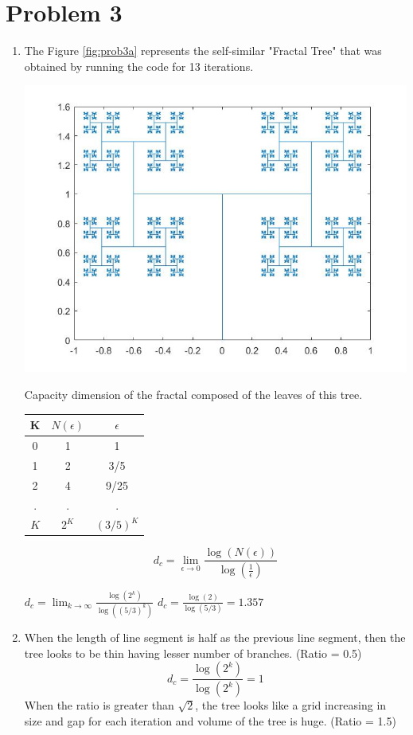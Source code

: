 \documentclass[11pt,a4paper]{article}
\begin{document}
\section*{Problem 3}

\begin{enumerate}[label=(\alph*)]

\item 
The Figure \ref{fig:prob3a} represents the self-similar "Fractal Tree" that was obtained by running the code for 13 iterations. \par\bigskip
\begin{minipage}{\linewidth}
{
\centering 
\includegraphics[scale=0.4]{images/prob3a.jpg}
\label{fig:prob3a}
}
\end{minipage}
\par\medskip
Capacity dimension of the fractal composed of the leaves of this tree.
\begin{center}
\begin{tabular}{ |c|c|c| } 
 \hline 
 K & $N(\epsilon)$ & $\epsilon$ \\
 \hline 
 0 & 1 & 1 \\ 
 1 & 2 & 3/5 \\
 2 & 4 & 9/25 \\
 . & . & . \\
 $K$ & $2^K$ & $(3/5)^K$\\
 \hline
\end{tabular}
\end{center}
$$d_c = \lim_{\epsilon \to 0} \frac{\log(N(\epsilon))}{\log(\frac{1}{\epsilon})}$$
\centerline
{
$d_c = \lim_{k \to \infty} \frac{\log(2^{k})}{\log((5/3)^{k})}$
$d_c = \frac{\log(2)}{\log(5/3)} = 1.357$
}
\item
When the length of line segment is half as the previous line segment, then the tree looks to be thin having lesser number of branches. (Ratio = 0.5)
$$d_c = \frac{\log(2^k)}{\log(2^k)} = 1$$
When the ratio is greater than $\sqrt{2}$, the tree looks like a grid increasing in size and gap for each iteration and volume of the tree is huge. (Ratio = 1.5)


\end{enumerate}
\end{document}

